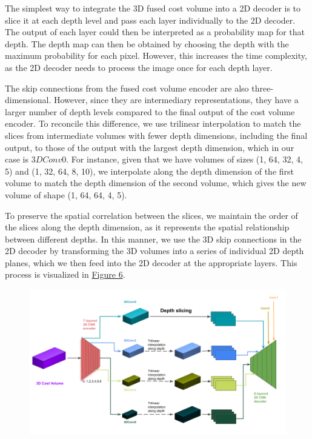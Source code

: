 \begin{enumerate}
    The simplest way to integrate the 3D fused cost volume into a 2D decoder is to slice it at each depth level and pass each layer individually to the 2D decoder. The output of each layer could then be interpreted as a probability map for that depth. The depth map can then be obtained by choosing the depth with the maximum probability for each pixel. However, this increases the time complexity, as the 2D decoder needs to process the image once for each depth layer. \par
    The skip connections from the fused cost volume encoder are also three-dimensional. However, since they are intermediary representations, they have a larger number of depth levels compared to the final output of the cost volume encoder. To reconcile this difference, we use trilinear interpolation to match the slices from intermediate volumes with fewer depth dimensions, including the final output, to those of the output with the largest depth dimension, which in our case is $3DConv0$. For instance, given that we have volumes of sizes (1, 64, 32, 4, 5) and (1, 32, 64, 8, 10), we interpolate along the depth dimension of the first volume to match the depth dimension of the second volume, which gives the new volume of shape (1, 64, 64, 4, 5). \par
    To preserve the spatial correlation between the slices, we maintain the order of the slices along the depth dimension, as it represents the spatial relationship between different depths. In this manner, we use the 3D skip connections in the 2D decoder by transforming the 3D volumes into a series of individual 2D depth planes, which we then feed into the 2D decoder at the appropriate layers. This process is visualized in \hyperref[fig:2ddec-3dcv]{Figure 6}.\par
    \begin{figure}[ht]
    \centering
     \includegraphics[width=1\textwidth]{images/2ddec-3dcv.png}

\end{figure}
\end{enumerate}
